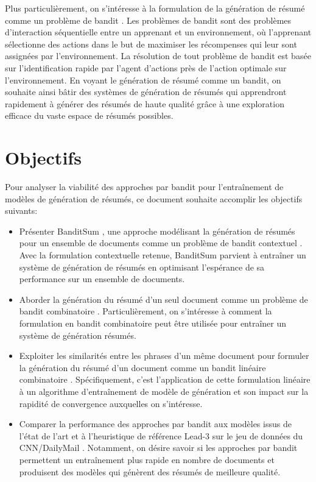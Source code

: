 Plus particulièrement, on s'intéresse à la formulation 
de la génération de résumé comme un problème de bandit \citep{Robbins:1952}.
Les problèmes de bandit sont des problèmes d'interaction séquentielle
entre un apprenant et un environnement, où l'apprenant sélectionne 
des actions dans le but de maximiser les récompenses 
qui leur sont assignées par l'environnement.
La résolution de tout problème de bandit est basée sur 
l'identification rapide par l'agent d'actions près 
de l'action optimale sur l'environnement.
En voyant le génération de résumé comme un bandit, on souhaite ainsi bâtir 
des systèmes de génération de résumés qui apprendront rapidement à générer 
des résumés de haute qualité grâce à une exploration efficace du vaste espace de résumés 
possibles. 


\section*{Objectifs}

Pour analyser la viabilité des approches par bandit pour l'entraînement 
de modèles de génération de résumés, ce document souhaite accomplir les objectifs suivants:

\begin{itemize}
      \item Présenter BanditSum \citep{dong2018banditsum}, une approche 
            modélisant la génération de résumés pour un ensemble de documents
            comme un problème de bandit contextuel \citep{contextual_bandits}.
            Avec la formulation contextuelle retenue, BanditSum 
            parvient à entraîner un système de génération de résumés 
            en optimisant l'espérance de sa performance sur un 
            ensemble de documents.
      \item Aborder la génération du résumé d'un seul document comme 
            un problème de bandit combinatoire \citep{pmlr-v28-chen13a}.
            Particulièrement, on s'intéresse à comment la formulation 
            en bandit combinatoire peut être utilisée pour entraîner un système 
            de génération résumés.   
      \item Exploiter les similarités entre les phrases d'un même 
            document pour formuler la génération du résumé d'un 
            document comme un bandit linéaire combinatoire \citep{NEURIPS2018_207f8801}.
            Spécifiquement, c'est l'application de cette formulation linéaire
            à un algorithme d'entraînement de modèle de génération 
            et son impact sur la rapidité de convergence auxquelles on s'intéresse.
      \item Comparer la performance des approches par bandit 
            aux modèles issus de l'état de l'art et à l'heuristique de
            référence Lead-3 \citep{10.5555/3298483.3298681} sur le jeu de données 
            du CNN/DailyMail \citep{hermann2015teaching}.
            Notamment, on désire savoir si les approches par bandit 
            permettent un entraînement plus rapide en nombre de documents
            et produisent des modèles qui génèrent des résumés de meilleure qualité.
\end{itemize}

